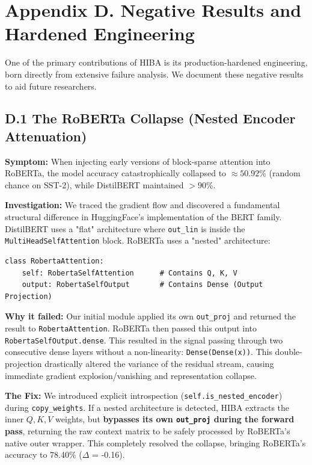 \section{Appendix D. Negative Results and Hardened Engineering}

One of the primary contributions of HIBA is its production-hardened engineering, born directly from extensive failure analysis. We document these negative results to aid future researchers.

\subsection{D.1 The RoBERTa Collapse (Nested Encoder Attenuation)}

\textbf{Symptom:} When injecting early versions of block-sparse attention into RoBERTa, the model accuracy catastrophically collapsed to $\approx 50.92\%$ (random chance on SST-2), while DistilBERT maintained $>90\%$.

\textbf{Investigation:} 
We traced the gradient flow and discovered a fundamental structural difference in HuggingFace's implementation of the BERT family. DistilBERT uses a "flat" architecture where \texttt{out\_lin} is inside the \texttt{MultiHeadSelfAttention} block. 
RoBERTa uses a "nested" architecture:
\begin{lstlisting}
class RobertaAttention:
    self: RobertaSelfAttention      # Contains Q, K, V
    output: RobertaSelfOutput       # Contains Dense (Output Projection)

\end{lstlisting}

\textbf{Why it failed:}
Our initial module applied its own \texttt{out\_proj} and returned the result to \texttt{RobertaAttention}. RoBERTa then passed this output into \texttt{RobertaSelfOutput.dense}. This resulted in the signal passing through two consecutive dense layers without a non-linearity: \texttt{Dense(Dense(x))}. This double-projection drastically altered the variance of the residual stream, causing immediate gradient explosion/vanishing and representation collapse.

\textbf{The Fix:}
We introduced explicit introspection (\texttt{self.is\_nested\_encoder}) during \texttt{copy\_weights}. If a nested architecture is detected, HIBA extracts the inner $Q, K, V$ weights, but \textbf{bypasses its own \texttt{out\_proj} during the forward pass}, returning the raw context matrix to be safely processed by RoBERTa's native outer wrapper. This completely resolved the collapse, bringing RoBERTa's accuracy to 78.40\% ($\Delta$ = -0.16).

